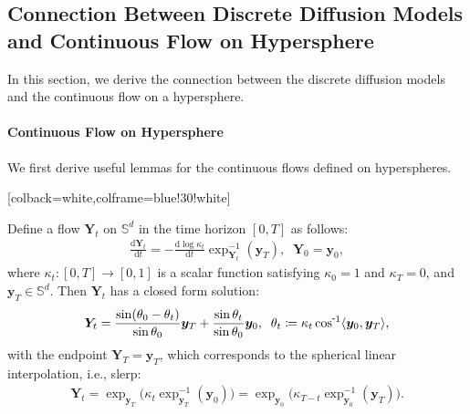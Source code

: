 \subsection{Connection Between Discrete Diffusion Models and Continuous Flow on Hypersphere}\label{app:derivation:generalization}
In this section, we derive the connection between the discrete diffusion models and the continuous flow on a hypersphere.


\paragraph{Continuous Flow on Hypersphere}
We first derive useful lemmas for the continuous flows defined on hyperspheres.

\begin{tcolorbox}
[colback=white,colframe=blue!30!white]
\begin{lemma}
\label{lem:flow_solution}
Define a flow $\bm{Y}_t$ on $\mathbb{S}^d$ in the time horizon $[0,T]$ as follows:
\begin{align}
    \frac{\mathrm{d}\bm{Y}_t}{\mathrm{d}t} = 
    -\frac{\mathrm{d}\log \kappa_t}{\mathrm{d}t}
    \exp^{-1}_{\bm{Y}_t}(\bm{y}_T), \;\; \bm{Y}_0=\bm{y}_0, 
\label{eq:flow_def}
\end{align}
where $\kappa_t:[0,T]\rightarrow[0,1]$ is a scalar function satisfying $\kappa_0=1$ and $\kappa_T=0$, and $\bm{y}_T\in\mathbb{S}^d$. 
Then $\bm{Y}_t$ has a closed form solution:
\begin{align}
    \bm{Y}_t = \frac{\sin(\theta_0-\theta_t)}{\sin\theta_0}\bm{y}_T + \frac{\sin\theta_t}{\sin\theta_0}\bm{y}_0, \;\;
    \theta_t\coloneqq \kappa_t\invcos \langle \bm{y}_0,\bm{y}_T \rangle,
\label{eq:flow_solution}
\end{align}
with the endpoint $\bm{Y}_T=\bm{y}_T$, which corresponds to the spherical linear interpolation, i.e., slerp:
\begin{align}
    \bm{Y}_t
    = \exp_{\bm{y}_T}\Big( \kappa_{t}\exp^{-1}_{\bm{y}_T}(\bm{y}_0) \Big) 
    = \exp_{\bm{y}_0}\Big( \kappa_{T-t}\exp^{-1}_{\bm{y}_0}(\bm{y}_T) \Big) .
\label{eq:geodesic}
\end{align}
\end{lemma}
\end{tcolorbox}

